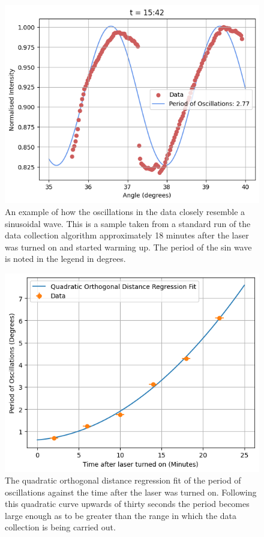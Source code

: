 \documentclass[%
reprint,
amsmath,amssymb,
aps,
]{revtex4-2}
\begin{document}
			\begin{figure}
				\includegraphics[width=0.85\columnwidth]{exampleTimeDependence.png}
				\caption{\label{fig:exampleTimeDependence}An example of how the oscillations in the data closely resemble a sinusoidal wave. This is a sample taken from a standard run of the data collection algorithm approximately 18 minutes after the laser was turned on and started warming up. The period of the sin wave is noted in the legend in degrees.}
			\end{figure}
			\begin{figure}
				\includegraphics[width=0.85\columnwidth]{quadraticFit.png}
				\caption{\label{fig:quadraticDependence}The quadratic orthogonal distance regression fit of the period of oscillations against the time after the laser was turned on. Following this quadratic curve upwards of thirty seconds the period becomes large enough as to be greater than the range in which the data collection is being carried out.}
			\end{figure}
\end{document}
